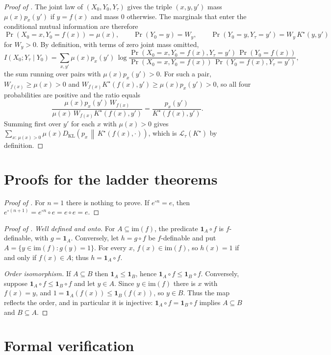 \documentclass[11pt]{article}
\theoremstyle{definition}
\newcommand{\im}{\mathrm{im}}
\newcommand{\1}{\mathbf{1}}
\newcommand{\DKL}[2]{D_{\mathrm{KL}}\!\left(#1\,\middle\|\,#2\right)}
\begin{document}
\begin{proof}[Proof of ]
The joint law of $(X_0,Y_0,Y_\tau)$ gives the triple $(x,y,y')$ mass $\mu(x)p_x(y')$ if $y=f(x)$ and mass $0$ otherwise.
The marginals that enter the conditional mutual information are therefore
\[
  \Pr(X_0=x,Y_0=f(x))=\mu(x),\qquad \Pr(Y_0=y)=W_y,\qquad \Pr(Y_0=y,Y_\tau=y')=W_y\,K^\star(y,y')
\]
for $W_y>0$.
By definition, with terms of zero joint mass omitted,
\[
  I(X_0;Y_\tau\mid Y_0)=\sum_{x,y'}\mu(x)p_x(y')\,\log\frac{\Pr(X_0=x,Y_0=f(x),Y_\tau=y')\,\Pr(Y_0=f(x))}{\Pr(X_0=x,Y_0=f(x))\,\Pr(Y_0=f(x),Y_\tau=y')},
\]
the sum running over pairs with $\mu(x)p_x(y')>0$.
For such a pair, $W_{f(x)}\ge\mu(x)>0$ and $W_{f(x)}K^\star(f(x),y')\ge\mu(x)p_x(y')>0$, so all four probabilities are positive and the ratio equals
\[
  \frac{\mu(x)p_x(y')\,W_{f(x)}}{\mu(x)\,W_{f(x)}K^\star(f(x),y')}=\frac{p_x(y')}{K^\star(f(x),y')}.
\]
Summing first over $y'$ for each $x$ with $\mu(x)>0$ gives $\sum_{x:\,\mu(x)>0}\mu(x)\DKL{p_x}{K^\star(f(x),\cdot)}$, which is $\mathcal{L}_\tau(K^\star)$ by definition.
\end{proof}
 \section{Proofs for the ladder theorems}\label{app:packdef}

\begin{proof}[Proof of ]
For $n=1$ there is nothing to prove.
If $e^{\circ n}=e$, then $e^{\circ(n+1)}=e^{\circ n}\circ e=e\circ e=e$.
\end{proof}

\begin{proof}[Proof of ]
\emph{Well defined and onto.}
For $A\subseteq\im(f)$, the predicate $\1_A\circ f$ is $f$-definable, with $g=\1_A$.
Conversely, let $h=g\circ f$ be $f$-definable and put $A=\{y\in\im(f):g(y)=1\}$.
For every $x$, $f(x)\in\im(f)$, so $h(x)=1$ if and only if $f(x)\in A$; thus $h=\1_A\circ f$.

\emph{Order isomorphism.}
If $A\subseteq B$ then $\1_A\le\1_B$, hence $\1_A\circ f\le\1_B\circ f$.
Conversely, suppose $\1_A\circ f\le\1_B\circ f$ and let $y\in A$.
Since $y\in\im(f)$ there is $x$ with $f(x)=y$, and $1=\1_A(f(x))\le\1_B(f(x))$, so $y\in B$.
Thus the map reflects the order, and in particular it is injective: $\1_A\circ f=\1_B\circ f$ implies $A\subseteq B$ and $B\subseteq A$.
\end{proof}
 \section{Formal verification}\label{app:formalization}
\end{document}
